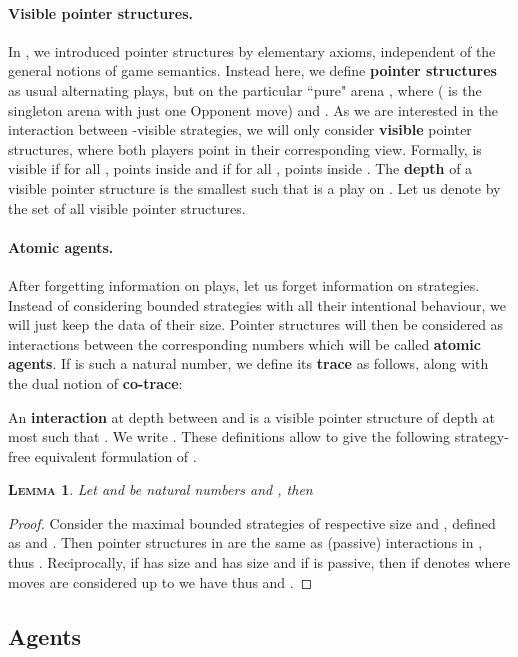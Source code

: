 \documentclass{article}
\newtheorem{lemma}{\textsc{Lemma}}
\begin{document}
\paragraph{Visible pointer structures.}
In \cite{totality}, we introduced pointer structures by elementary axioms, independent of the general notions of game semantics. Instead here, we define \textbf{pointer
structures} as usual alternating plays, but on the particular ``pure" arena , where  ( is the singleton
arena with just one Opponent move) and . 
As we are interested in the interaction between -visible strategies, we will only consider \textbf{visible} pointer structures,
where both players point in their corresponding view. Formally,  is visible if for all , 
 points inside  and if for all ,  points inside . The \textbf{depth} of a visible pointer structure  is the smallest 
such that  is a play on . Let us denote by  the set of all visible pointer structures.

\paragraph{Atomic agents.}
After forgetting information on plays, let us forget information on strategies. Instead of considering bounded strategies with all their intentional behaviour,
we will just keep the data of their size. Pointer structures will then be considered as interactions between the corresponding numbers which will be called
\textbf{atomic agents}. If  is such a natural number, we define its \textbf{trace} as follows, along with the dual notion of \textbf{co-trace}:

An \textbf{interaction} at depth  between  and  is a visible pointer structure  of depth at most  such that .
We write . These definitions allow to give the following strategy-free equivalent formulation of .

\begin{lemma}
Let  and  be natural numbers and , then

\end{lemma}
\begin{proof}
Consider the maximal bounded strategies of respective size  and , defined as  
and . Then pointer structures in  are the same as (passive) interactions
in , thus . Reciprocally, if  has size  and  has size
 and if  is passive, then if  denotes  where moves are considered up to  we have 
thus  and .
\end{proof}

\subsection{Agents}
\end{document}

